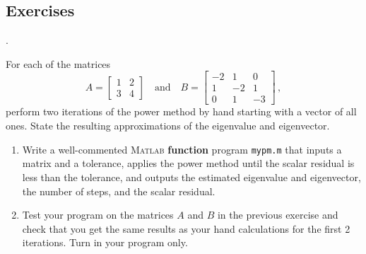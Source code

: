 \subsection*{Exercises}
\begin{list}
{.}{}

\item For each of the matrices
$$
  A =\left[\begin{array}{cc}
      1&2\\
      3&4
    \end{array}\right]    \quad \text{and} \quad
  B =\left[\begin{array}{ccc}
      -2&1&0\\
      1&-2&1\\
      0&1&-3
    \end{array}\right]
 \,,
$$
 perform two iterations of
  the power method by hand starting with a vector of all ones.
  State the resulting approximations of the eigenvalue and
  eigenvector.
\item 
  \begin{enumerate}
  \item[(a)] Write a well-commented \textsc{Matlab} {\bf function} program
    \verb&mypm.m& that inputs a matrix and a tolerance, applies the
    power method until the scalar residual is less than the
    tolerance, and outputs  the estimated
    eigenvalue and eigenvector, the number of steps, and the scalar residual.
 \item[(b)] 
   Test your program on the matrices $A$ and $B$ in the previous exercise and check
   that you get the same results as your hand calculations for the first 2 iterations. 
   Turn in your program only.
\end{enumerate}

\end{list}




